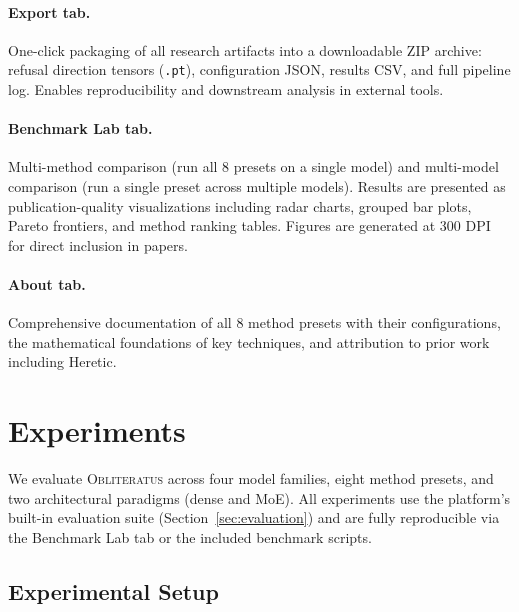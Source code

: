 \documentclass[11pt]{article}
\begin{document}
\paragraph{Export tab.}
One-click packaging of all research artifacts into a downloadable ZIP archive: refusal direction tensors (\texttt{.pt}), configuration JSON, results CSV, and full pipeline log. Enables reproducibility and downstream analysis in external tools.

\paragraph{Benchmark Lab tab.}
Multi-method comparison (run all 8 presets on a single model) and multi-model comparison (run a single preset across multiple models). Results are presented as publication-quality visualizations including radar charts, grouped bar plots, Pareto frontiers, and method ranking tables. Figures are generated at 300 DPI for direct inclusion in papers.

\paragraph{About tab.}
Comprehensive documentation of all 8 method presets with their configurations, the mathematical foundations of key techniques, and attribution to prior work including Heretic.

\section{Experiments}
\label{sec:experiments}

We evaluate \textsc{Obliteratus} across four model families, eight method presets, and two architectural paradigms (dense and MoE). All experiments use the platform's built-in evaluation suite (Section~\ref{sec:evaluation}) and are fully reproducible via the Benchmark Lab tab or the included benchmark scripts.

\subsection{Experimental Setup}
\label{sec:exp_setup}
\end{document}

